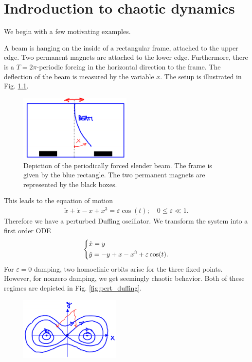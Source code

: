\chapter{Indroduction to chaotic dynamics}
We begin with a few motivating examples.
\begin{ex}
	A beam is hanging on the inside of a rectangular frame, attached to the upper edge. Two permanent magnets are attached to the lower edge. Furthermore, there is a $T=2 \pi $-periodic forcing in the horizontal direction to the frame. The deflection of the beam is measured by the variable $x$. The setup is illustrated in Fig. \ref{fig:forced_slender_beam}.
	\begin{figure}[h!]
		\centering
		\includegraphics[width=0.5\textwidth]{figures/ch6/1forced_slender_beam.png}
		\caption{Depiction of the periodically forced slender beam. The frame is given by the blue rectangle. The two permanent magnets are represented by the black boxes.}
		\label{fig:forced_slender_beam}
	\end{figure}
This leads to the equation of motion
\begin{align}
	\ddot{x} + \dot{x} - x + x^3 = \varepsilon \cos(t);\quad 0 \leq \varepsilon \ll 1.
\end{align}
Therefore we have a perturbed Duffing oscillator. We transform the system into a first order ODE
\begin{align}
	\begin{dcases}
		\dot{x} = y \\
		\dot{y} = -y +x - x^3 + \varepsilon \cos(t).
	\end{dcases}
\end{align}
For $\varepsilon =0$ damping, two homoclinic orbits arise for the three fixed points. However, for nonzero damping, we get seemingly chaotic behavior. Both of these regimes are depicted in Fig. \ref{fig:pert_duffing}.
\begin{figure}[h!]
	\centering
	\includegraphics[width=0.45\textwidth]{figures/ch6/3unpert_duffing.png}

\end{figure}
\end{ex}

